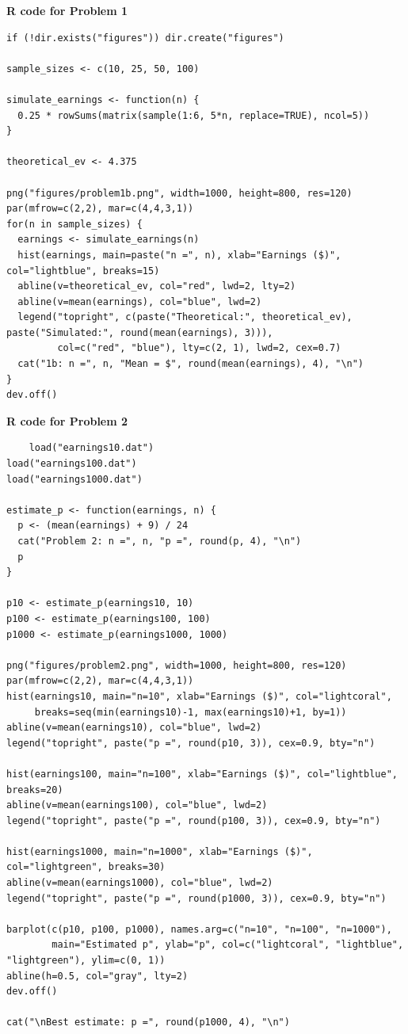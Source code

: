 \documentclass[12pt]{amsart}
\theoremstyle{remark}
\theoremstyle{mycomment}
\begin{document}
\begin{center}
	\textbf{R code for Problem 1}
\end{center}
\begin{lstlisting}
if (!dir.exists("figures")) dir.create("figures")

sample_sizes <- c(10, 25, 50, 100)

simulate_earnings <- function(n) {
  0.25 * rowSums(matrix(sample(1:6, 5*n, replace=TRUE), ncol=5))
}

theoretical_ev <- 4.375

png("figures/problem1b.png", width=1000, height=800, res=120)
par(mfrow=c(2,2), mar=c(4,4,3,1))
for(n in sample_sizes) {
  earnings <- simulate_earnings(n)
  hist(earnings, main=paste("n =", n), xlab="Earnings ($)", col="lightblue", breaks=15)
  abline(v=theoretical_ev, col="red", lwd=2, lty=2)
  abline(v=mean(earnings), col="blue", lwd=2)
  legend("topright", c(paste("Theoretical:", theoretical_ev), paste("Simulated:", round(mean(earnings), 3))), 
         col=c("red", "blue"), lty=c(2, 1), lwd=2, cex=0.7)
  cat("1b: n =", n, "Mean = $", round(mean(earnings), 4), "\n")
}
dev.off()

\end{lstlisting}
\begin{center}
	\textbf{R code for Problem 2}
\end{center}
\begin{lstlisting}
	load("earnings10.dat")
load("earnings100.dat")
load("earnings1000.dat")

estimate_p <- function(earnings, n) {
  p <- (mean(earnings) + 9) / 24
  cat("Problem 2: n =", n, "p =", round(p, 4), "\n")
  p
}

p10 <- estimate_p(earnings10, 10)
p100 <- estimate_p(earnings100, 100)
p1000 <- estimate_p(earnings1000, 1000)

png("figures/problem2.png", width=1000, height=800, res=120)
par(mfrow=c(2,2), mar=c(4,4,3,1))
hist(earnings10, main="n=10", xlab="Earnings ($)", col="lightcoral", 
     breaks=seq(min(earnings10)-1, max(earnings10)+1, by=1))
abline(v=mean(earnings10), col="blue", lwd=2)
legend("topright", paste("p =", round(p10, 3)), cex=0.9, bty="n")

hist(earnings100, main="n=100", xlab="Earnings ($)", col="lightblue", breaks=20)
abline(v=mean(earnings100), col="blue", lwd=2)
legend("topright", paste("p =", round(p100, 3)), cex=0.9, bty="n")

hist(earnings1000, main="n=1000", xlab="Earnings ($)", col="lightgreen", breaks=30)
abline(v=mean(earnings1000), col="blue", lwd=2)
legend("topright", paste("p =", round(p1000, 3)), cex=0.9, bty="n")

barplot(c(p10, p100, p1000), names.arg=c("n=10", "n=100", "n=1000"),
        main="Estimated p", ylab="p", col=c("lightcoral", "lightblue", "lightgreen"), ylim=c(0, 1))
abline(h=0.5, col="gray", lty=2)
dev.off()

cat("\nBest estimate: p =", round(p1000, 4), "\n")

\end{lstlisting}
\end{document}
